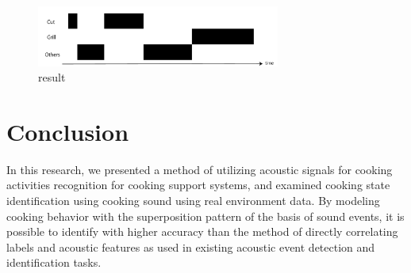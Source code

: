 \documentclass[sigconf]{acmart}
\begin{document}
\begin{figure}[t]
  \centering
  \includegraphics[width=8cm]{fig/N63_m4_smoothed.pdf}
  \caption{result}
  \Description{}
  \label{baseine_timeline_smoothed_result}
\end{figure}


\section{Conclusion}
In this research, we presented a method of utilizing acoustic signals for cooking activities recognition for cooking support systems, and examined cooking state identification using cooking sound using real environment data.
By modeling cooking behavior with the superposition pattern of the basis of sound events, it is possible to identify with higher accuracy than the method of directly correlating labels and acoustic features as used in existing acoustic event detection and identification tasks.



%



%
\end{document}
